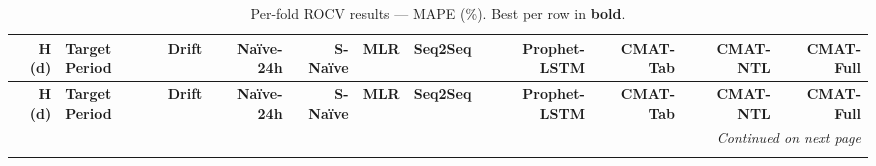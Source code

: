 \begingroup\small\setlength{\tabcolsep}{2pt}\renewcommand{\arraystretch}{1.2}
\begin{longtable}{r l r r r r r r r r r}
\caption{Per-fold ROCV results --- MAPE (\%). Best per row in \textbf{bold}.}
\label{tab:baseline_mape} \\

\toprule
\textbf{H (d)} & \textbf{Target Period} & \textbf{Drift} & \textbf{Na\"ive-24h} & \textbf{S-Na\"ive} & \textbf{MLR} & \textbf{Seq2Seq} & \textbf{Prophet-LSTM} & \textbf{CMAT-Tab} & \textbf{CMAT-NTL} & \textbf{CMAT-Full} \\
\midrule
\endfirsthead

\toprule
\textbf{H (d)} & \textbf{Target Period} & \textbf{Drift} & \textbf{Na\"ive-24h} & \textbf{S-Na\"ive} & \textbf{MLR} & \textbf{Seq2Seq} & \textbf{Prophet-LSTM} & \textbf{CMAT-Tab} & \textbf{CMAT-NTL} & \textbf{CMAT-Full} \\
\midrule
\endhead

\midrule
\multicolumn{11}{r}{\textit{Continued on next page}} \\
\endfoot

\bottomrule
\endlastfoot


\end{longtable}

